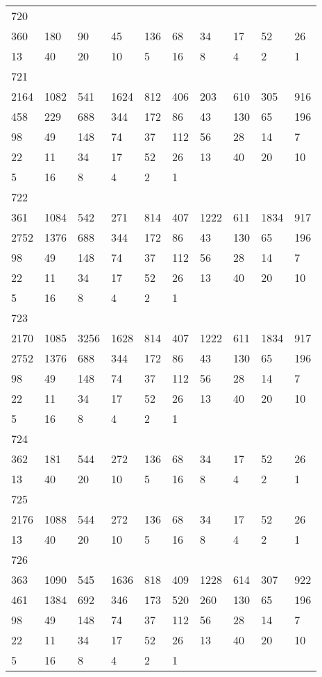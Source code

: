 \begin{longtable}{*{10}{l}}
720&&&&&&&&&\\
360& 180& 90& 45& 136& 68& 34& 17& 52& 26\\
13& 40& 20& 10& 5& 16& 8& 4& 2& 1\\

721&&&&&&&&&\\
2164& 1082& 541& 1624& 812& 406& 203& 610& 305& 916\\
458& 229& 688& 344& 172& 86& 43& 130& 65& 196\\
98& 49& 148& 74& 37& 112& 56& 28& 14& 7\\
22& 11& 34& 17& 52& 26& 13& 40& 20& 10\\
5& 16& 8& 4& 2& 1& \\

722&&&&&&&&&\\
361& 1084& 542& 271& 814& 407& 1222& 611& 1834& 917\\
2752& 1376& 688& 344& 172& 86& 43& 130& 65& 196\\
98& 49& 148& 74& 37& 112& 56& 28& 14& 7\\
22& 11& 34& 17& 52& 26& 13& 40& 20& 10\\
5& 16& 8& 4& 2& 1& \\

723&&&&&&&&&\\
2170& 1085& 3256& 1628& 814& 407& 1222& 611& 1834& 917\\
2752& 1376& 688& 344& 172& 86& 43& 130& 65& 196\\
98& 49& 148& 74& 37& 112& 56& 28& 14& 7\\
22& 11& 34& 17& 52& 26& 13& 40& 20& 10\\
5& 16& 8& 4& 2& 1& \\

724&&&&&&&&&\\
362& 181& 544& 272& 136& 68& 34& 17& 52& 26\\
13& 40& 20& 10& 5& 16& 8& 4& 2& 1\\

725&&&&&&&&&\\
2176& 1088& 544& 272& 136& 68& 34& 17& 52& 26\\
13& 40& 20& 10& 5& 16& 8& 4& 2& 1\\

726&&&&&&&&&\\
363& 1090& 545& 1636& 818& 409& 1228& 614& 307& 922\\
461& 1384& 692& 346& 173& 520& 260& 130& 65& 196\\
98& 49& 148& 74& 37& 112& 56& 28& 14& 7\\
22& 11& 34& 17& 52& 26& 13& 40& 20& 10\\
5& 16& 8& 4& 2& 1& \\


\end{longtable}
